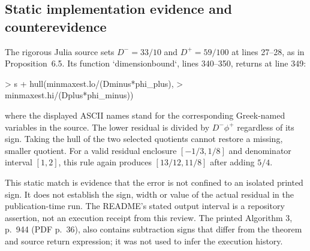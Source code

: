 \documentclass[10pt]{article}
\begin{document}
\subsection*{Static implementation evidence and counterevidence}
The rigorous Julia source sets \(D^-=33/10\) and \(D^+=59/100\) at lines 27–28, as in Proposition 6.5. Its function `dimensionbound`, lines 340–350, returns at line 349:\par
> s + hull(minmaxest.lo/(Dminus*phi\_plus),
> minmaxest.hi/(Dplus*phi\_minus))\par
where the displayed ASCII names stand for the corresponding Greek-named variables in the source. The lower residual is divided by \(D^-\phi^+\) regardless of its sign. Taking the hull of the two selected quotients cannot restore a missing, smaller quotient. For a valid residual enclosure \([-1/3,1/8]\) and denominator interval \([1,2]\), this rule again produces \([13/12,11/8]\) after adding \(5/4\).\par
This static match is evidence that the error is not confined to an isolated printed sign. It does not establish the sign, width or value of the actual residual in the publication-time run. The README’s stated output interval is a repository assertion, not an execution receipt from this review. The printed Algorithm 3, p. 944 (PDF p. 36), also contains subtraction signs that differ from the theorem and source return expression; it was not used to infer the execution history.\par
\end{document}

